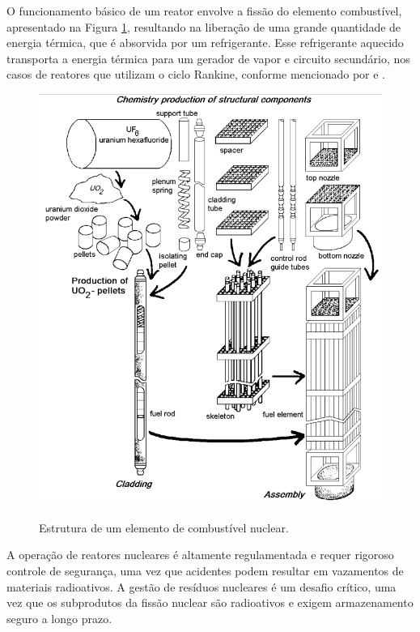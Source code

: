 O funcionamento básico de um reator envolve a fissão do elemento combustível, apresentado na Figura \ref{fig:element_structure}, resultando na liberação de uma grande quantidade de energia térmica, que é absorvida por um refrigerante. Esse refrigerante aquecido transporta a energia térmica para um gerador de vapor e circuito secundário, nos casos de reatores que utilizam o ciclo Rankine, conforme mencionado por \citep{rezende2019} e \citep{glasstone1994}.

\begin{figure}[H]
    \centering
    \caption{Estrutura de um elemento de combustível nuclear.}    
    \includegraphics[scale=0.5]{figures/others/nuclear_fuel_rod.png}
    \label{fig:element_structure}
\end{figure}

A operação de reatores nucleares é altamente regulamentada e requer rigoroso controle de segurança, uma vez que acidentes podem resultar em vazamentos de materiais radioativos. A gestão de resíduos nucleares é um desafio crítico, uma vez que os subprodutos da fissão nuclear são radioativos e exigem armazenamento seguro a longo prazo.

